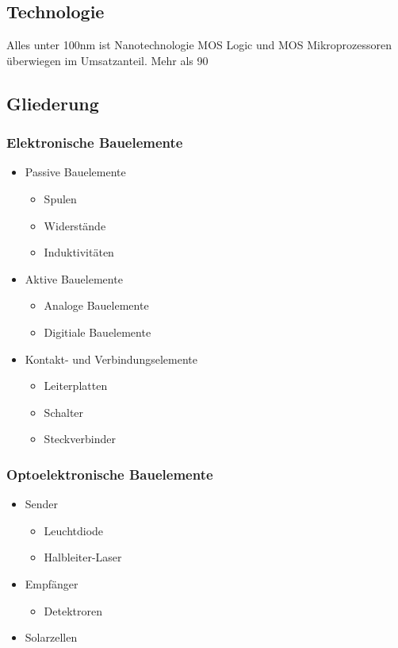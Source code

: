 \subsection{Technologie}
Alles unter 100nm ist Nanotechnologie
MOS Logic und MOS Mikroprozessoren überwiegen im Umsatzanteil.
Mehr als 90%

\subsection{Gliederung}

\subsubsection{Elektronische Bauelemente}
\begin{itemize}
	\item Passive Bauelemente
	\begin{itemize}
		\item Spulen
		\item Widerstände
		\item Induktivitäten
	\end{itemize}
	\item Aktive Bauelemente
	\begin{itemize}
		\item Analoge Bauelemente
		\item Digitiale Bauelemente
	\end{itemize}
	\item Kontakt- und Verbindungselemente
	\begin{itemize}
		\item Leiterplatten
		\item Schalter
		\item Steckverbinder
	\end{itemize}
\end{itemize}
\subsubsection{Optoelektronische Bauelemente}
\begin{itemize}
	\item Sender
	\begin{itemize}
		\item Leuchtdiode
		\item Halbleiter-Laser
	\end{itemize}
	\item Empfänger
	\begin{itemize}
		\item Detektroren
	\end{itemize}
	\item Solarzellen
\end{itemize}


